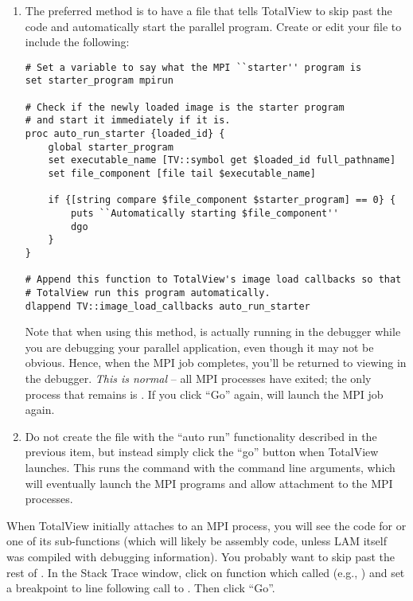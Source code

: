 \begin{enumerate}
\item The preferred method is to have a  file
  that tells TotalView to skip past the  code and
  automatically start the parallel program.  Create or edit your
   file to include the following:

\lstset{style=lam-shell}
\begin{lstlisting}
# Set a variable to say what the MPI ``starter'' program is
set starter_program mpirun

# Check if the newly loaded image is the starter program
# and start it immediately if it is.
proc auto_run_starter {loaded_id} {
    global starter_program
    set executable_name [TV::symbol get $loaded_id full_pathname]
    set file_component [file tail $executable_name]

    if {[string compare $file_component $starter_program] == 0} {
        puts ``Automatically starting $file_component''
        dgo
    }
}

# Append this function to TotalView's image load callbacks so that
# TotalView run this program automatically.
dlappend TV::image_load_callbacks auto_run_starter
\end{lstlisting}

Note that when using this method,  is actually running in
the debugger while you are debugging your parallel application, even
though it may not be obvious.  Hence, when the MPI job completes,
you'll be returned to viewing  in the debugger.  {\em This
  is normal} -- all MPI processes have exited; the only process that
remains is .  If you click ``Go'' again,  will
launch the MPI job again.

\item Do not create the  file with the ``auto
  run'' functionality described in the previous item, but instead
  simply click the ``go'' button when TotalView launches.  This runs
  the  command with the command line arguments, which will
  eventually launch the MPI programs and allow attachment to the MPI
  processes.
  
\end{enumerate}

When TotalView initially attaches to an MPI process, you will see the
code for  or one of its sub-functions (which will
likely be assembly code, unless LAM itself was compiled with debugging
information).
%
You probably want to skip past the rest of .  In
the Stack Trace window, click on function which called
 (e.g., ) and set a breakpoint to line
following call to .  Then click ``Go''.

